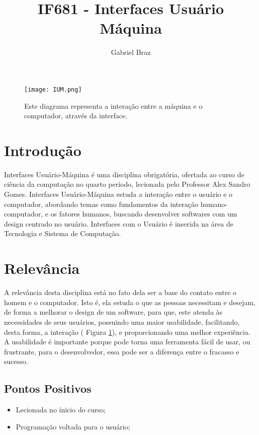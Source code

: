 \documentclass[a4paper]{article}
\title{IF681 - Interfaces Usuário Máquina}
\author{Gabriel Braz}
\begin{document}
\maketitle

\begin{figure}[h]
\centering
\texttt{[image: IUM.png]}
\caption{\label{fig:IUM}\cite{fig_IUM}Este diagrama representa a interação entre a máquina e o computador, através da interface.}
\end{figure}

\section{Introdução}

Interfaces Usuário-Máquina\cite{site_disciplina} é uma disciplina obrigatória, ofertada ao curso de ciência da computação no quarto período, lecionada pelo Professor Alex Sandro Gomes. Interfaces Usuário-Máquina estuda a interação entre o usuário e o computador, abordando temas como fundamentos da interação humano-computador, e os fatores humanos\cite{site_cadeira}, buscando desenvolver softwares com um design centrado no usuário. Interfaces com o Usuário é inserida na área de Tecnologia e Sistema de Computação.

\section{Relevância}

A relevância desta disciplina está no fato dela ser a base do contato entre o homem e o computador. Isto é, ela estuda o que as pessoas necessitam e desejam, de forma a melhorar o design de um software, para que, este atenda às necessidades de seus usuários, possuindo uma maior usabilidade, facilitando, desta forma, a interação ( Figura \ref{fig:IUM}), e proporcionando uma melhor experiência. A usabilidade é importante porque pode torna uma ferramenta fácil de usar, ou frustrante, para o desenvolvedor, essa pode ser a diferença entre o fracasso e sucesso.

\subsection{Pontos Positivos}

\begin{itemize}
\item Lecionada no ínicio do curso;
\item Programação voltada para o usuário;
\end{itemize}
\end{document}
